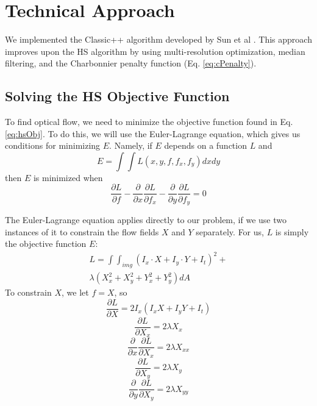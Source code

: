 \documentclass[10pt,twocolumn,letterpaper]{article}
\begin{document}
\section{Technical Approach}

We implemented the Classic++ algorithm developed by Sun et al  \cite{sun}. This approach improves upon the HS algorithm by using multi-resolution optimization, median filtering, and the Charbonnier penalty function (Eq. \ref{eq:cPenalty}).

\subsection{Solving the HS Objective Function}

To find optical flow, we need to minimize the objective function found in Eq. \ref{eq:hsObj}.  To do this, we will use the Euler-Lagrange equation, which gives us conditions for minimizing $E$.  Namely, if $E$ depends on a function $L$ and
\begin{equation} \label{eq:eulerL}
E = \int \int L(x, y, f, f_x, f_y) dxdy
\end{equation}
then $E$ is minimized when 
\begin{equation} \label{eq:eulerCondition}
\frac{\partial L}{\partial f} - \frac{\partial}{\partial x} \frac{\partial L}{\partial f_x} - \frac{\partial}{\partial y} \frac{\partial L}{\partial f_y} = 0
\end{equation}

The Euler-Lagrange equation applies directly to our problem, if we use two instances of it to constrain the flow fields $X$ and $Y$ separately.  For us, $L$ is simply the objective function $E$: 
\begin{multline} \label{eq:eulerL2}
L =  \int \int_{img} (I_x \cdot X + I_y \cdot Y + I_t)^2 + \\
\lambda ( X_x^2 + X_y^2 + Y_x^2 + Y_y^2 ) dA 
\end{multline}
To constrain $X$, we let $f=X$, so 
\begin{equation} \label{eq:eulerPlug1}
\frac{\partial L}{\partial X} = 2I_x (I_x X + I_y Y + I_t)
\end{equation}
\begin{equation} \label{eq:eulerPlug2}
\frac{\partial L}{\partial X_x} = 2 \lambda X_x
\end{equation}
\begin{equation} \label{eq:eulerPlug3}
\frac{\partial}{\partial x} \frac{\partial L}{\partial X_x} = 2 \lambda X_{xx}
\end{equation}
\begin{equation} \label{eq:eulerPlug4}
\frac{\partial L}{\partial X_y} = 2 \lambda X_y
\end{equation}
\begin{equation} \label{eq:eulerPlug5}
\frac{\partial}{\partial y} \frac{\partial L}{\partial X_y} = 2 \lambda X_{yy}
\end{equation}
\end{document}
